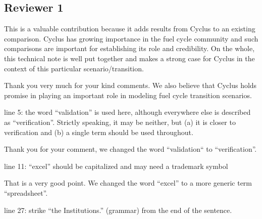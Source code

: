 \documentclass[answers,11pt]{exam}
\begin{document}
\begin{questions}
\section*{Reviewer 1}

        \question This is a valuable contribution because it adds results from 
        Cyclus to an existing comparison.  Cyclus has growing importance in the 
        fuel cycle community and such comparisons are important for 
        establishing its role and credibility.  On the whole, this technical 
        note is well put together and makes a strong case for Cyclus in the 
        context of this particular scenario/transition.

        \begin{solution}
        Thank you very much for your kind comments. We also believe that
        Cyclus holds promise in playing an important role in modeling
        fuel cycle transition scenarios.
        \end{solution}

        \question line 5: the word ``validation'' is used here, although 
        everywhere else is described as ``verification''.  Strictly speaking, 
        it may be neither, but (a) it is closer to verification and (b) a 
        single term should be used throughout.

        \begin{solution}
        Thank you for your comment, we changed the word ``validation`` to
        ``verification''.
        \end{solution}

        \question line 11: ``excel'' should be capitalized and may need a 
        trademark symbol

        \begin{solution}
        That is a very good point. We changed the word ``excel'' to a
        more generic term ``spreadsheet''.
        \end{solution}

        \question line 27: strike ``the Institutions.'' (grammar) from the end 
        of the sentence.


\end{questions}
\end{document}
